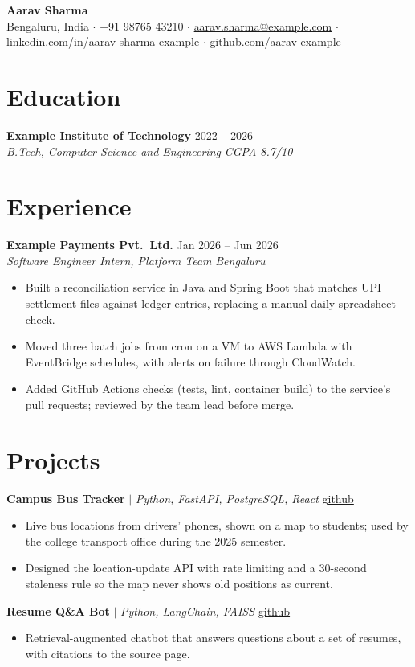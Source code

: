 \documentclass[10.5pt,a4paper]{article}
\newcommand{\entry}[4]{%
  \textbf{#1} \hfill #2\\
  \textit{#3} \hfill \textit{#4}\par\vspace{1pt}}
\newcommand{\project}[3]{%
  \textbf{#1} $\vert$ \textit{#2} \hfill #3\par\vspace{1pt}}
\begin{document}
\begin{center}
  {\LARGE\bfseries Aarav Sharma}\\[3pt]
  Bengaluru, India $\cdot$ +91 98765 43210 $\cdot$
  \href{mailto:aarav.sharma@example.com}{aarav.sharma@example.com} $\cdot$
  \href{https://linkedin.com/in/aarav-sharma-example}{linkedin.com/in/aarav-sharma-example} $\cdot$
  \href{https://github.com/aarav-example}{github.com/aarav-example}
\end{center}

\section{Education}
\entry{Example Institute of Technology}{2022 -- 2026}{B.Tech, Computer Science and Engineering}{CGPA 8.7/10}

\section{Experience}
\entry{Example Payments Pvt.\ Ltd.}{Jan 2026 -- Jun 2026}{Software Engineer Intern, Platform Team}{Bengaluru}
\begin{itemize}
  \item Built a reconciliation service in Java and Spring Boot that matches UPI settlement files against ledger entries, replacing a manual daily spreadsheet check.
  \item Moved three batch jobs from cron on a VM to AWS Lambda with EventBridge schedules, with alerts on failure through CloudWatch.
  \item Added GitHub Actions checks (tests, lint, container build) to the service's pull requests; reviewed by the team lead before merge.
\end{itemize}

\section{Projects}
\project{Campus Bus Tracker}{Python, FastAPI, PostgreSQL, React}{\href{https://github.com/aarav-example/bus-tracker}{github}}
\begin{itemize}
  \item Live bus locations from drivers' phones, shown on a map to students; used by the college transport office during the 2025 semester.
  \item Designed the location-update API with rate limiting and a 30-second staleness rule so the map never shows old positions as current.
\end{itemize}
\project{Resume Q\&A Bot}{Python, LangChain, FAISS}{\href{https://github.com/aarav-example/resume-bot}{github}}
\begin{itemize}
  \item Retrieval-augmented chatbot that answers questions about a set of resumes, with citations to the source page.
\end{itemize}
\end{document}
